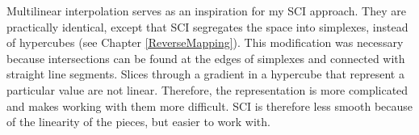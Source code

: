 Multilinear interpolation serves as an inspiration for my SCI approach.
They are practically identical, except that SCI segregates the space into simplexes, instead of hypercubes (see Chapter \ref{ReverseMapping}).
This modification was necessary because intersections can be found at the edges of simplexes and connected with straight line segments.
Slices through a gradient in a hypercube that represent a particular value are not linear.
Therefore, the representation is more complicated and makes working with them more difficult.
SCI is therefore less smooth because of the linearity of the pieces, but easier to work with.






